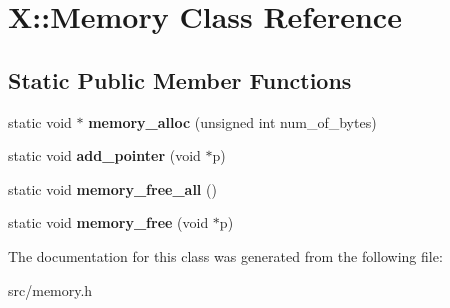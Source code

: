 \hypertarget{class_x_1_1_memory}{\section{X\-:\-:Memory Class Reference}
\label{class_x_1_1_memory}
}
\subsection*{Static Public Member Functions}
\begin{DoxyCompactItemize}
\item 
\hypertarget{class_x_1_1_memory_ad4c4cb43672d7ab7f2543e68cd40b93a}{static void $\ast$ {\bfseries memory\-\_\-alloc} (unsigned int num\-\_\-of\-\_\-bytes)}\label{class_x_1_1_memory_ad4c4cb43672d7ab7f2543e68cd40b93a}

\item 
\hypertarget{class_x_1_1_memory_a2eef9505ead1adcba03628665c025ed6}{static void {\bfseries add\-\_\-pointer} (void $\ast$p)}\label{class_x_1_1_memory_a2eef9505ead1adcba03628665c025ed6}

\item 
\hypertarget{class_x_1_1_memory_ad866f58377ffede78835829f6574541b}{static void {\bfseries memory\-\_\-free\-\_\-all} ()}\label{class_x_1_1_memory_ad866f58377ffede78835829f6574541b}

\item 
\hypertarget{class_x_1_1_memory_a53866b5281569781abeb525035554681}{static void {\bfseries memory\-\_\-free} (void $\ast$p)}\label{class_x_1_1_memory_a53866b5281569781abeb525035554681}

\end{DoxyCompactItemize}


The documentation for this class was generated from the following file\-:\begin{DoxyCompactItemize}
\item 
src/memory.\-h\end{DoxyCompactItemize}
